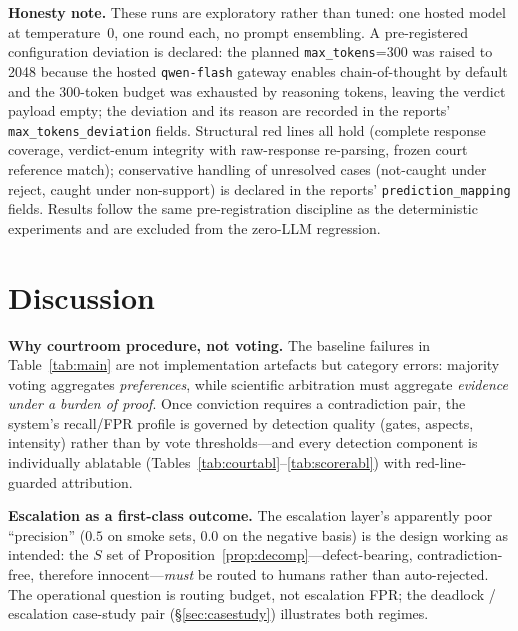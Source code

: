 \documentclass[11pt]{article}
\begin{document}
\textbf{Honesty note.} These runs are exploratory rather than tuned: one
hosted model at temperature~0, one round each, no prompt ensembling.
A pre-registered configuration deviation is declared: the planned
\texttt{max\_tokens}=300 was raised to 2048 because the hosted
\texttt{qwen-flash} gateway enables chain-of-thought by default and the
300-token budget was exhausted by reasoning tokens, leaving the verdict
payload empty; the deviation and its reason are recorded in the reports'
\texttt{max\_tokens\_deviation} fields. Structural red lines all hold
(complete response coverage, verdict-enum integrity with raw-response
re-parsing, frozen court reference match); conservative handling of
unresolved cases (not-caught under reject, caught under non-support) is
declared in the reports' \verb|prediction_mapping| fields. Results
follow the same pre-registration discipline as the deterministic
experiments and are excluded from the zero-LLM regression.

\section{Discussion}\label{sec:discussion}

\textbf{Why courtroom procedure, not voting.} The baseline failures in
Table~\ref{tab:main} are not implementation artefacts but category errors:
majority voting aggregates \emph{preferences}, while scientific arbitration
must aggregate \emph{evidence under a burden of proof}. Once conviction
requires a contradiction pair, the system's recall/FPR profile is governed
by detection quality (gates, aspects, intensity) rather than by vote
thresholds—and every detection component is individually ablatable
(Tables~\ref{tab:courtabl}--\ref{tab:scorerabl}) with red-line-guarded
attribution.

\textbf{Escalation as a first-class outcome.} The escalation layer's
apparently poor ``precision'' ($0.5$ on smoke sets, $0.0$ on the negative
basis) is the design working as intended: the $S$ set of
Proposition~\ref{prop:decomp}—defect-bearing, contradiction-free, therefore
innocent—\emph{must} be routed to humans rather than auto-rejected. The
operational question is routing budget, not escalation FPR; the deadlock /
escalation case-study pair (\S\ref{sec:casestudy}) illustrates both regimes.
\end{document}

